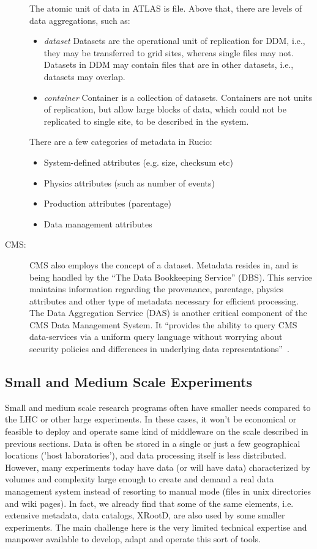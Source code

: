 \begin{description}
The atomic unit of data in ATLAS is file. Above that, there are levels of data aggregations, such as:
\begin{itemize}
\item \textit{dataset} Datasets are the operational unit of replication for DDM, i.e., they may be transferred to grid sites, whereas single files
may not. Datasets in DDM may contain files that are in other datasets, i.e., datasets may overlap.
\item \textit{container} Container is a collection of datasets. Containers are not units of replication, but allow
large blocks of data, which could not be replicated to single site, to be described in the system.
\end{itemize}

There are a few categories of metadata in Rucio:
\begin{itemize}
\item  System-defined attributes (e.g. size, checksum etc)
\item Physics attributes (such as number of events)
\item Production attributes (parentage)
\item Data management attributes
\end{itemize}

\item[CMS:] CMS also employs the concept of a dataset. Metadata resides in, and is being handled by the ``The Data Bookkeeping Service'' (DBS).
This service maintains information regarding the provenance, parentage, physics attributes and other type of metadata necessary for efficient processing.
The Data Aggregation Service (DAS)  is another critical component of the CMS Data Management System. It ``provides the ability to query CMS data-services via
a uniform query language without worrying about security policies and differences in underlying data representations''~\cite{phedex_chep13}.

\end{description}

\subsection{Small and Medium Scale Experiments}
Small and medium scale research programs often have smaller needs compared to the LHC or other large experiments. In these cases, it won't
be economical or feasible to deploy and operate same kind of middleware on the scale described in previous sections.
Data is often be stored in a single or just a few geographical locations ('host laboratories'), and
data processing itself is less distributed. However, many experiments today have data (or will have data) characterized by volumes
and complexity large enough to create and demand a real data management system instead of resorting to manual mode (files in unix directories and wiki pages). 
In fact, we already find that some of the same elements, i.e. extensive metadata, data catalogs, XRootD, are also used by some smaller 
experiments. The main challenge here is the very limited technical expertise and manpower available to develop, adapt and 
operate this sort of tools.

